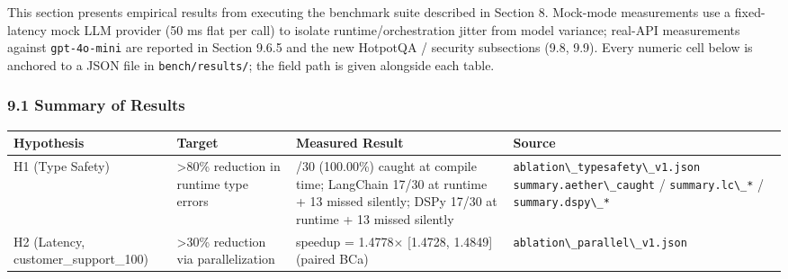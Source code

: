 \documentclass[
]{article}
\newcommand{\passthrough}[1]{#1}
\newcounter{none} %
\begin{document}
This section presents empirical results from executing the benchmark
suite described in Section 8. Mock-mode measurements use a fixed-latency
mock LLM provider (50 ms flat per call) to isolate runtime/orchestration
jitter from model variance; real-API measurements against
\passthrough{\lstinline!gpt-4o-mini!} are reported in Section 9.6.5 and
the new HotpotQA / security subsections (9.8, 9.9). Every numeric cell
below is anchored to a JSON file in
\passthrough{\lstinline!bench/results/!}; the field path is given
alongside each table.

\subsubsection{9.1 Summary of Results}\label{summary-of-results}

{\def\LTcaptype{none} %
\begin{longtable}[]{@{}
  >{\raggedright\arraybackslash}p{}
  >{\raggedright\arraybackslash}p{}
  >{\raggedright\arraybackslash}p{}
  >{\raggedright\arraybackslash}p{}@{}}
\toprule\noalign{}
\begin{minipage}[b]{\linewidth}\raggedright
Hypothesis
\end{minipage} & \begin{minipage}[b]{\linewidth}\raggedright
Target
\end{minipage} & \begin{minipage}[b]{\linewidth}\raggedright
Measured Result
\end{minipage} & \begin{minipage}[b]{\linewidth}\raggedright
Source
\end{minipage} \\
\midrule\noalign{}
\endhead
\bottomrule\noalign{}
\endlastfoot
H1 (Type Safety) & \textgreater80\% reduction in runtime type errors &
30/30 (100.00\%) caught at compile time; LangChain 17/30 at runtime + 13
missed silently; DSPy 17/30 at runtime + 13 missed silently &
\passthrough{\lstinline!ablation\_typesafety\_v1.json!}
\passthrough{\lstinline!summary.aether\_caught!} /
\passthrough{\lstinline!summary.lc\_*!} /
\passthrough{\lstinline!summary.dspy\_*!} \\
H2 (Latency, customer\_support\_100) & \textgreater30\% reduction via
parallelization & speedup = 1.4778× {[}1.4728, 1.4849{]} (paired BCa) &
\passthrough{\lstinline!ablation\_parallel\_v1.json!}

\end{longtable}}
\end{document}
